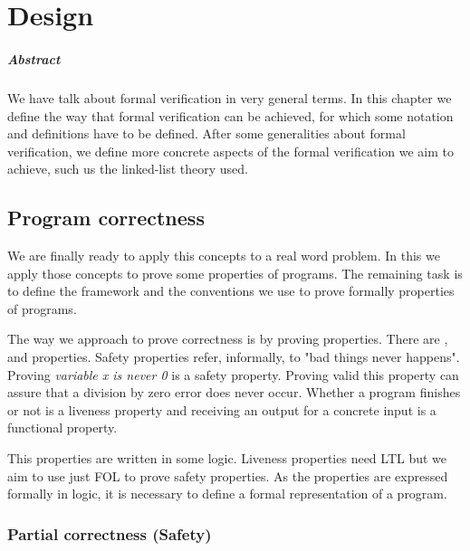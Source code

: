 \chapter{Design\label{chap:design}}

\paragraph{Abstract} 

We have talk about formal verification in very general terms. 
%
In this chapter we define the way that formal verification can be achieved, for which some notation and definitions have to be defined.
%
After some generalities about formal verification, we define more concrete aspects of the formal verification we aim to achieve, such us the linked-list theory used.


\section{Program correctness}


We are finally ready to apply this concepts to a real word problem. In this \thisworkm we apply those concepts to prove some properties of programs.
%
The remaining task is to define the framework and the conventions we use to prove formally properties of programs.

The way we approach to prove correctness is by proving properties. 
%
There are ,  and  properties. 
%
Safety properties refer, informally, to "bad things never happens". Proving \textit{ variable x is never 0 } is a safety property. 
%
Proving valid this property can assure that a division by zero error does never occur. 
%
Whether a program finishes or not is a liveness property and receiving an output for a concrete input is a functional property. 

This properties are written in some logic. 
%
Liveness properties need \gls{LTL} but we aim to use just \gls{FOL} to prove safety properties.
%
As the properties are expressed formally in logic, it is necessary to define a formal representation of a program.


\label{def:SPL}



\subsection{Partial correctness (Safety)}

